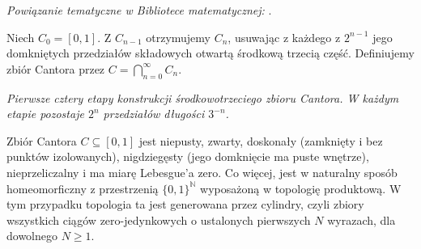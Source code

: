 \noindent\emph{Powiązanie tematyczne w Bibliotece matematycznej:} .


\begin{definicja}
\label{def:cantor-set}
Niech $C_0=[0,1]$. Z $C_{n-1}$ otrzymujemy $C_n$,
usuwając z każdego z $2^{n-1}$ jego domkniętych
przedziałów składowych otwartą środkową trzecią część.
Definiujemy zbiór Cantora przez
$C=\bigcap_{n=0}^\infty C_n$.
\end{definicja}

\begin{center}
\par\smallskip
\emph{Pierwsze cztery etapy konstrukcji środkowotrzeciego zbioru Cantora.
W każdym etapie pozostaje $2^n$ przedziałów długości $3^{-n}$.}
\end{center}

\begin{twierdzenie}
\label{thm:cantor-properties}
Zbiór Cantora $C\subseteq[0,1]$ jest niepusty, zwarty,
doskonały (zamknięty i bez punktów izolowanych),
nigdziegęsty (jego domknięcie ma puste wnętrze),
nieprzeliczalny i ma miarę Lebesgue'a zero.
Co więcej, jest w naturalny sposób homeomorficzny
z przestrzenią $\{0,1\}^{\mathbb N}$ wyposażoną
w topologię produktową. W tym przypadku topologia ta
jest generowana przez cylindry, czyli zbiory wszystkich
ciągów zero-jedynkowych o ustalonych pierwszych
$N$ wyrazach, dla dowolnego $N\ge1$.
\end{twierdzenie}

